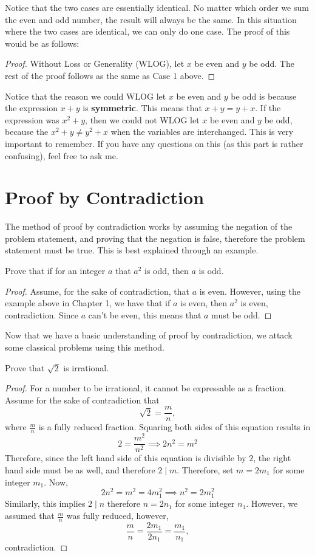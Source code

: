 Notice that the two cases are essentially identical. No matter which order we sum the even and odd number, the result will always be the same.  In this situation where the two cases are identical, we can only do one case.  The proof of this would be as follows:

\begin{proof}  

Without Loss or Generality (WLOG), let $x$ be even and $y$ be odd.   The rest of the proof follows as the same as Case 1 above.  \end{proof}


Notice that the reason we could WLOG let $x$ be even and $y$ be odd is because the expression $x+y$ is \textbf{symmetric}.  This means that $x+y=y+x$.  If the expression was $x^2+y$, then we could not WLOG let $x$ be even and $y$ be odd, because the $x^2+y\neq y^2+x$ when the variables are interchanged.  This is very important to remember.  If you have any questions on this (as this part is rather confusing), feel free to ask me.  

\section{Proof by Contradiction}
The method of proof by contradiction works by assuming the negation of the problem statement, and proving that the negation is false, therefore the problem statement must be true.  This is best explained through an example.  

\begin{exmp} Prove that if for an integer $a$ that $a^2$ is odd, then $a$ is odd. \end{exmp}
\begin{proof}  Assume, for the sake of contradiction, that $a$ is even.  However, using the example above in Chapter 1, we have that if $a$ is even, then $a^2$ is even, contradiction.  Since $a$ can't be even, this means that $a$ must be odd.   \end{proof}
Now that we have a basic understanding of proof by contradiction, we attack some classical problems using this method.

\begin{exmp}  Prove that $\sqrt{2}$ is irrational.  \end{exmp}
\begin{proof}  For a number to be irrational, it cannot be expressable as a fraction.  Assume for the sake of contradiction that $$\sqrt{2}=\frac{m}{n},$$ where $\frac{m}{n}$ is a fully reduced fraction.  Squaring both sides of this equation results in $$2=\frac{m^2}{n^2}\implies 2n^2=m^2$$
Therefore, since the left hand side of this equation is divisible by $2$, the right hand side must be as well, and therefore $2\mid m$.  Therefore, set $m=2m_1$ for some integer $m_1$.  Now, $$2n^2=m^2=4m_1^2\implies n^2=2m_1^2$$  Similarly, this implies $2\mid n$ therefore $n=2n_1$ for some integer $n_1$.  However, we assumed that $\frac{m}{n}$ was fully reduced, however, $$\frac{m}{n}=\frac{2m_1}{2n_1}=\frac{m_1}{n_1},$$ contradiction.  \end{proof}
 
